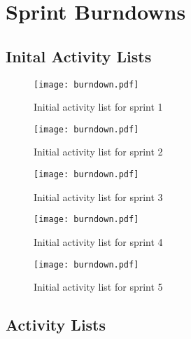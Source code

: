 \chapter{Sprint Burndowns}\label{appendix:burndown}

\section{Inital Activity Lists}

\begin{figure}[h!]
    \centering
	\texttt{[image: burndown.pdf]}
	\caption{Initial activity list for sprint 1}
	\label{fig:old_website_design}
\end{figure}

\begin{figure}[h!]
    \centering
	\texttt{[image: burndown.pdf]}
	\caption{Initial activity list for sprint 2}
	\label{fig:old_website_design}
\end{figure}

\begin{figure}[h!]
    \centering
	\texttt{[image: burndown.pdf]}
	\caption{Initial activity list for sprint 3}
	\label{fig:old_website_design}
\end{figure}

\begin{figure}[h!]
    \centering
	\texttt{[image: burndown.pdf]}
	\caption{Initial activity list for sprint 4}
	\label{fig:old_website_design}
\end{figure}


\begin{figure}[h!]
    \centering
	\texttt{[image: burndown.pdf]}
	\caption{Initial activity list for sprint 5}
	\label{fig:old_website_design}
\end{figure}


% 
% 
% 
\section{Activity Lists}

